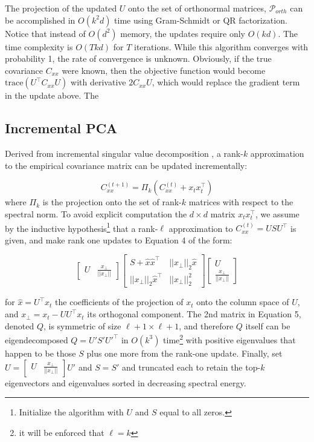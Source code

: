 \documentclass[11pt,letterpaper]{article}
\begin{document}
The projection of the updated $U$ onto the set of orthonormal matrices, $\mathcal{P}_{orth}$ can be accomplished in $O(k^2d)$ time using Gram-Schmidt or QR factorization. Notice that instead of $O(d^2)$ memory, the updates require only $O(kd)$. The time complexity is $O(Tkd)$ for $T$ iterations. While this algorithm converges with probability 1, the rate of convergence is unknown. Obviously, if the true covariance $C_{xx}$ were known, then the objective function would become $\text{trace}\left(U^{\top}C_{xx}U\right)$ with derivative $2C_{xx}U$, which would replace the gradient term in the update above.  The 

\subsection{Incremental PCA}
Derived from incremental singular value decomposition \cite{brand}, a rank-$k$ approximation to the empirical covariance matrix can be updated incrementally:

\begin{equation}
C_{xx}^{(t + 1)} = \Pi_k \left(C_{xx}^{(t)} + x_tx_t^{\top}\right)
\end{equation}
where $\Pi_k$ is the projection onto the set of rank-$k$ matrices with respect to the spectral norm. To avoid explicit computation the $d \times d$ matrix $x_tx_t^{\top}$, we assume by the inductive hypothesis\footnote{Initialize the algorithm with $U$ and $S$ equal to all zeros.} that a rank-$\ell$ approximation to $C_{xx}^{(t)} = USU^{\top}$ is given, and make rank one updates to Equation 4 of the form: 

\begin{equation}
\begin{bmatrix} U & \frac{x_{\perp}}{||x_{\perp}||} \end{bmatrix}  \begin{bmatrix} 
S + \hat{x}\hat{x}^{\top} & ||x_{\perp}||_2 \hat{x} \\
||x_{\perp}||_2 \hat{x}^{\top} & ||x_{\perp}||_2^2 \end{bmatrix}
\begin{bmatrix} U \\
 \frac{x_{\perp}}{||x_{\perp}||} \end{bmatrix}
\end{equation}

for $\hat{x} = U^{\top}x_t$ the coefficients of the projection of $x_t$ onto the column space of $U$, and $x_{\perp} = x_t - UU^{\top}x_t$ its orthogonal component. The 2nd matrix in Equation 5, denoted $Q$, is symmetric of size $\ell + 1 \times \ell +1$, and therefore $Q$ itself can be eigendecomposed $Q = U'S'U'^{\top}$ in $O(k^3)$ time\footnote{it will be enforced that $\ell = k$} with positive eigenvalues that happen to be those $S$ plus one more from the rank-one update. Finally, set $U = \begin{bmatrix} U & \frac{x_{\perp}}{||x_{\perp}||} \end{bmatrix} U'$ and $S = S'$ and truncated each to retain the top-$k$ eigenvectors and eigenvalues sorted in decreasing spectral energy. 
\end{document}
